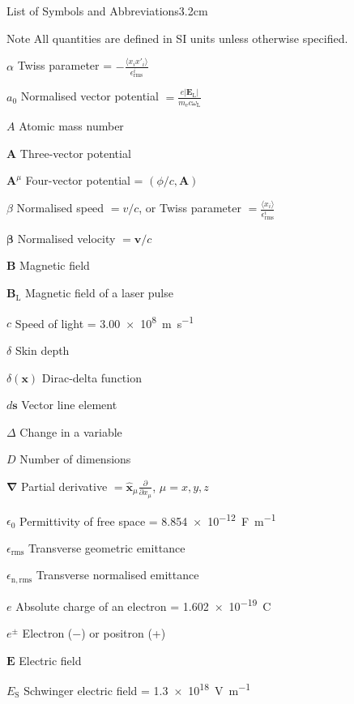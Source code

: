 \begin{mclistof}{List of Symbols and Abbreviations}{3.2cm}
\item[Note] All quantities are defined in SI units unless otherwise specified.
\item[$\alpha$] Twiss parameter = $-\frac{\langle x_i x'_i \rangle}{\epsilon^i_\mathrm{rms}}$
\item[$a_0$] Normalised vector potential $= \frac{e|\mathbf{E}_\mathrm{L}|}{m_\mathrm{e}c\omega_\mathrm{L}}$
\item[$A$] Atomic mass number
\item[$\mathbf{A}$] Three-vector potential
\item[$\mathbf{A}^\mu$] Four-vector potential = $(\phi/c, \mathbf{A})$
\item[$\beta$] Normalised speed $= v/c$, or Twiss parameter $= \frac{\langle x_i \rangle}{\epsilon^i_\mathrm{rms}}$
\item[$\mathbf{\beta}$] Normalised velocity $= \mathbf{v}/c$
\item[$\mathbf{B}$] Magnetic field
\item[$\mathbf{B}_\mathrm{L}$] Magnetic field of a laser pulse
\item[$c$] Speed of light = \qty{3.00e8}{m.s^{-1}}
\item[$\delta$] Skin depth
\item[$\delta(\mathbf{x})$] Dirac-delta function
\item[$d\mathbf{s}$] Vector line element
\item[$\Delta$] Change in a variable
\item[$D$] Number of dimensions
\item[$\mathbf{\nabla}$] Partial derivative $= \hat{\mathbf{x}}_\mu \frac{\partial }{\partial x_\mu}$, $\mu = x,y,z$
\item[$\epsilon_0$] Permittivity of free space = \qty{8.854e-12}{F.m^{-1}}
\item[$\epsilon_\mathrm{rms}$] Transverse geometric emittance
\item[$\epsilon_\mathrm{n,rms}$] Transverse normalised emittance
\item[$e$] Absolute charge of an electron = \qty{1.602e-19}{C}
\item[$e^\pm$] Electron ($-$) or positron (+)
\item[$\mathbf{E}$] Electric field
\item[$E_\mathrm{S}$] Schwinger electric field = \qty{1.3e18}{V.m^{-1}}

\end{mclistof}
